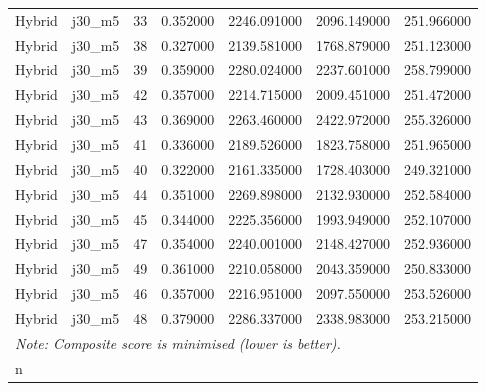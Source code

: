 \begin{tabular}{llrrrrr}
Hybrid & j30_m5 & 33 & 0.352000 & 2246.091000 & 2096.149000 & 251.966000 \\
Hybrid & j30_m5 & 38 & 0.327000 & 2139.581000 & 1768.879000 & 251.123000 \\
Hybrid & j30_m5 & 39 & 0.359000 & 2280.024000 & 2237.601000 & 258.799000 \\
Hybrid & j30_m5 & 42 & 0.357000 & 2214.715000 & 2009.451000 & 251.472000 \\
Hybrid & j30_m5 & 43 & 0.369000 & 2263.460000 & 2422.972000 & 255.326000 \\
Hybrid & j30_m5 & 41 & 0.336000 & 2189.526000 & 1823.758000 & 251.965000 \\
Hybrid & j30_m5 & 40 & 0.322000 & 2161.335000 & 1728.403000 & 249.321000 \\
Hybrid & j30_m5 & 44 & 0.351000 & 2269.898000 & 2132.930000 & 252.584000 \\
Hybrid & j30_m5 & 45 & 0.344000 & 2225.356000 & 1993.949000 & 252.107000 \\
Hybrid & j30_m5 & 47 & 0.354000 & 2240.001000 & 2148.427000 & 252.936000 \\
Hybrid & j30_m5 & 49 & 0.361000 & 2210.058000 & 2043.359000 & 250.833000 \\
Hybrid & j30_m5 & 46 & 0.357000 & 2216.951000 & 2097.550000 & 253.526000 \\
Hybrid & j30_m5 & 48 & 0.379000 & 2286.337000 & 2338.983000 & 253.215000 \\
\bottomrule
\multicolumn{6}{l}{\small\textit{Note: Composite score is minimised (lower is better).}}\\n
\end{tabular}
